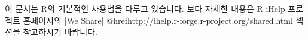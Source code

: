 \documentclass{article}
\begin{document}
이 문서는 R의 기본적인 사용법을 다루고 있습니다. 보다 자세한 내용은 R-iHelp 프로젝트 홈페이지의 [We Share] @href{http://ihelp.r-forge.r-project.org/shared.html} 섹션을 참고하시기 바랍니다.




\end{document}
